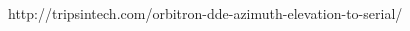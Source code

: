 \begin{thebibliography}{[1]}

http://tripsintech.com/orbitron-dde-azimuth-elevation-to-serial/

\end{thebibliography}
